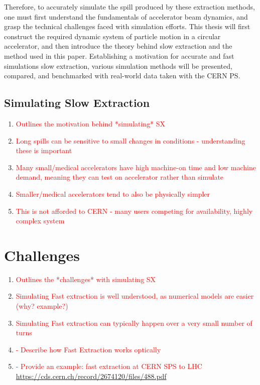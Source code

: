 \documentclass[11pt]{report}
\newcommand\todo[1]{\textcolor{red}{#1}}
\begin{document}
Therefore, to accurately simulate the spill produced by these extraction methods, one must first understand the fundamentals of accelerator beam dynamics, and grasp the technical challenges faced with simulation efforts. This thesis will first construct the required dynamic system of particle motion in a circular accelerator, and then introduce the theory behind slow extraction and the method used in this paper. Establishing a motivation for accurate and fast simulations slow extraction, various simulation methods will be presented, compared, and benchmarked with real-world data taken with the CERN PS.


\subsection{Simulating Slow Extraction}
\begin{enumerate}
  \item \todo{Outlines the motivation behind *simulating* SX}
  \item \todo{Long spills can be sensitive to small changes in conditions - understanding these is important}
  \item \todo{Many small/medical accelerators have high machine-on time and low machine demand, meaning they can test on accelerator rather than simulate}
  \item \todo{Smaller/medical accelerators tend to also be physically simpler}
  \item \todo{This is not afforded to CERN - many users competing for availability, highly complex system}
\end{enumerate}

\section{Challenges}
\begin{enumerate}
  \item \todo{Outlines the *challenges* with simulating SX}
  \item \todo{Simulating Fast extraction is well understood, as numerical models are easier (why? example?)}
  \item \todo{Simulating Fast extraction can typically happen over a very small number of turns}
  \item \todo{- Describe how Fast Extraction works optically}
\item \todo{- Provide an example: fast extraction at CERN SPS to LHC \url{https://cds.cern.ch/record/2674120/files/488.pdf}}
\end{enumerate}
\end{document}
